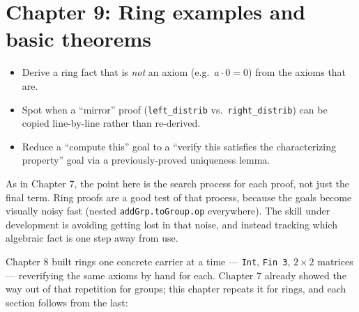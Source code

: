 \chapter{Chapter 9: Ring examples and basic theorems}\label{sec:09-ring-theorems:00-index:1}

\begin{learningobjectives}
\begin{itemize}
\tightlist
\item
  Derive a ring fact that is \emph{not} an axiom (e.g.~\(a\cdot 0=0\)) from the axioms that are.
\item
  Spot when a ``mirror'' proof (\texttt{left\_\allowbreak{}distrib} vs.~\texttt{right\_\allowbreak{}distrib}) can be copied line-by-line rather than re-derived.
\item
  Reduce a ``compute this'' goal to a ``verify this satisfies the characterizing property'' goal via a previously-proved uniqueness lemma.
\end{itemize}
\end{learningobjectives}


As in Chapter 7, the point here is the search process for each proof, not just the final term. Ring proofs are a good test of that process, because the goals become visually noisy fast (nested \texttt{addGrp.toGroup.op} everywhere). The skill under development is avoiding getting lost in that noise, and instead tracking which algebraic fact is one step away from use.

Chapter 8 built rings one concrete carrier at a time --- \texttt{Int}, \texttt{Fin 3}, \(2\times 2\) matrices --- reverifying the same axioms by hand for each. Chapter 7 already showed the way out of that repetition for groups; this chapter repeats it for rings, and each section follows from the last:

